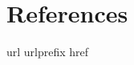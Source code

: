 \documentclass[preprint,12pt]{elsarticle}
\begin{document}

%


\section*{References}\label{sec:ref}




 
%
\begin{thebibliography}{1}
\expandafter\ifx\csname url\endcsname\relax
  \def\url#1{\texttt{#1}}\fi
\expandafter\ifx\csname urlprefix\endcsname\relax\def\urlprefix{URL }\fi
\expandafter\ifx\csname href\endcsname\relax
  \def\href#1#2{#2} \def\path#1{#1}\fi

\end{thebibliography}
\end{document}

